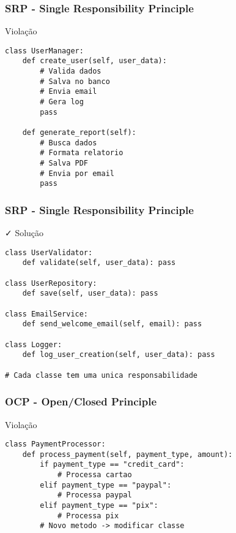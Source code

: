 \documentclass[aspectratio=169]{beamer}
\begin{document}
\begin{frame}[fragile]
\frametitle{SRP - Single Responsibility Principle}
\begin{block}{\textcolor{cleanred}{\faTimes} Violação}
\scriptsize
\begin{lstlisting}
class UserManager:
    def create_user(self, user_data):
        # Valida dados
        # Salva no banco
        # Envia email
        # Gera log
        pass
        
    def generate_report(self):
        # Busca dados
        # Formata relatorio
        # Salva PDF
        # Envia por email
        pass
\end{lstlisting}
\end{block}
\end{frame}

\begin{frame}[fragile]
\frametitle{SRP - Single Responsibility Principle}
\begin{block}{\textcolor{cleangreen}{\faCheck} Solução}
\scriptsize
\begin{lstlisting}
class UserValidator:
    def validate(self, user_data): pass

class UserRepository:
    def save(self, user_data): pass

class EmailService:
    def send_welcome_email(self, email): pass

class Logger:
    def log_user_creation(self, user_data): pass

# Cada classe tem uma unica responsabilidade
\end{lstlisting}
\end{block}
\end{frame}

\begin{frame}[fragile]
\frametitle{OCP - Open/Closed Principle}
\begin{block}{\textcolor{cleanred}{\faTimes} Violação}
\scriptsize
\begin{lstlisting}
class PaymentProcessor:
    def process_payment(self, payment_type, amount):
        if payment_type == "credit_card":
            # Processa cartao
        elif payment_type == "paypal":
            # Processa paypal
        elif payment_type == "pix":
            # Processa pix
        # Novo metodo -> modificar classe
\end{lstlisting}
\end{block}
\end{frame}
\end{document}
